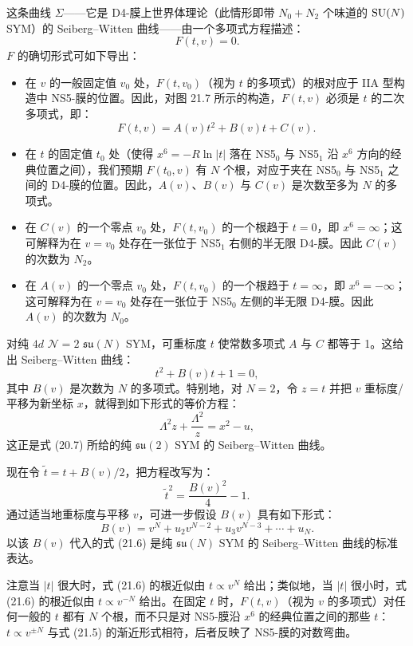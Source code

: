 这条曲线 $\Sigma$——它是 D4-膜上世界体理论（此情形即带 $N_0+N_2$ 个味道的 $\operatorname{SU}(N)$ SYM）的 Seiberg–Witten 曲线——由一个多项式方程描述：
\[
F(t,v)=0.
\]
$F$ 的确切形式可如下导出：
\begin{itemize}
  \item 在 $v$ 的一般固定值 $v_0$ 处，$F(t,v_0)$（视为 $t$ 的多项式）的根对应于 IIA 型构造中 NS5-膜的位置。因此，对图 21.7 所示的构造，$F(t,v)$ 必须是 $t$ 的二次多项式，即：
\[
F(t,v)=A(v)t^2+B(v)t+C(v).
\]
  \item 在 $t$ 的固定值 $t_0$ 处（使得 $x^6=-R\ln|t|$ 落在 NS5$_0$ 与 NS5$_1$ 沿 $x^6$ 方向的经典位置之间），我们预期 $F(t_0,v)$ 有 $N$ 个根，对应于夹在 NS5$_0$ 与 NS5$_1$ 之间的 D4-膜的位置。因此，$A(v)$、$B(v)$ 与 $C(v)$ 是次数至多为 $N$ 的多项式。
  \item 在 $C(v)$ 的一个零点 $v_0$ 处，$F(t,v_0)$ 的一个根趋于 $t=0$，即 $x^6=\infty$；这可解释为在 $v=v_0$ 处存在一张位于 NS5$_1$ 右侧的半无限 D4-膜。因此 $C(v)$ 的次数为 $N_2$。
  \item 在 $A(v)$ 的一个零点 $v_0$ 处，$F(t,v_0)$ 的一个根趋于 $t=\infty$，即 $x^6=-\infty$；这可解释为在 $v=v_0$ 处存在一张位于 NS5$_0$ 左侧的半无限 D4-膜。因此 $A(v)$ 的次数为 $N_0$。
\end{itemize}

\begin{example}[21.9] 对纯 $4d$ $\mathcal{N}=2$ $\mathfrak{su}(N)$ SYM，可重标度 $t$ 使常数多项式 $A$ 与 $C$ 都等于 1。这给出 Seiberg–Witten 曲线：
\begin{equation}
t^2+B(v)t+1=0,
\tag{21.6}
\end{equation}
其中 $B(v)$ 是次数为 $N$ 的多项式。特别地，对 $N=2$，令 $z=t$ 并把 $v$ 重标度/平移为新坐标 $x$，就得到如下形式的等价方程：
\[
\Lambda^2z+\frac{\Lambda^2}{z}=x^2-u,
\]
这正是式 (20.7) 所给的纯 $\mathfrak{su}(2)$ SYM 的 Seiberg–Witten 曲线。\end{example}

现在令 $\tilde t=t+B(v)/2$，把方程改写为：
\begin{equation}
\tilde t^2=\frac{B(v)^2}{4}-1.
\tag{21.7}
\end{equation}
通过适当地重标度与平移 $v$，可进一步假设 $B(v)$ 具有如下形式：
\[
B(v)=v^N+u_2v^{N-2}+u_3v^{N-3}+\cdots+u_N.
\]
以该 $B(v)$ 代入的式 (21.6) 是纯 $\mathfrak{su}(N)$ SYM 的 Seiberg–Witten 曲线的标准表达。

\begin{remark}[21.10] 注意当 $|t|$ 很大时，式 (21.6) 的根近似由 $t\propto v^N$ 给出；类似地，当 $|t|$ 很小时，式 (21.6) 的根近似由 $t\propto v^{-N}$ 给出。在固定 $t$ 时，$F(t,v)$（视为 $v$ 的多项式）对任何一般的 $t$ 都有 $N$ 个根，而不只是对 NS5-膜沿 $x^6$ 的经典位置之间的那些 $t$：$t\propto v^{\pm N}$ 与式 (21.5) 的渐近形式相符，后者反映了 NS5-膜的对数弯曲。\end{remark}

